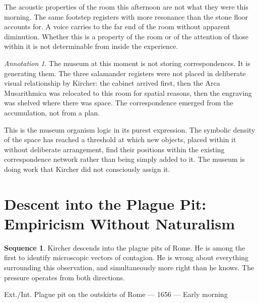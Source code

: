 \documentclass[12pt, a4paper, twoside]{memoir}
\theoremstyle{definition}
\newtheorem{sequence}{Sequence}[chapter]
\theoremstyle{remark}
\newtheorem{annotation}{Annotation}[chapter]
\newenvironment{sceneheading}{%
  \vspace{8pt}%
  \noindent\begin{mdframed}[
    linecolor=arkgold,
    linewidth=0.8pt,
    leftmargin=0pt,
    rightmargin=0pt,
    innerleftmargin=6pt,
    innerrightmargin=6pt,
    innertopmargin=4pt,
    innerbottommargin=4pt,
    backgroundcolor=arkgold!6
  ]%
  \noindent\textsc\bgroup\small
}{%
  \egroup\end{mdframed}\vspace{4pt}%
}
\newenvironment{museumnote}{%
  \vspace{4pt}%
  \noindent\begin{mdframed}[
    linecolor=arkgold!60,
    linewidth=0.4pt,
    leftline=true, rightline=false, topline=false, bottomline=false,
    innerleftmargin=8pt,
    innerrightmargin=0pt,
    innertopmargin=2pt,
    innerbottommargin=2pt,
    backgroundcolor=arkgold!4
  ]%
  \footnotesize\color{plaguegrey}%
}{%
  \end{mdframed}\vspace{4pt}%
}
\begin{document}
\begin{museumnote}
The acoustic properties of the room this afternoon are not what they were this morning. The same footstep registers with more resonance than the stone floor accounts for. A voice carries to the far end of the room without apparent diminution. Whether this is a property of the room or of the attention of those within it is not determinable from inside the experience.
\end{museumnote}

\begin{annotation}
The museum at this moment is not storing correspondences. It is generating them. The three salamander registers were not placed in deliberate visual relationship by Kircher: the cabinet arrived first, then the Arca Musarithmica was relocated to this room for spatial reasons, then the engraving was shelved where there was space. The correspondence emerged from the accumulation, not from a plan.

This is the museum organism logic in its purest expression. The symbolic density of the space has reached a threshold at which new objects, placed within it without deliberate arrangement, find their positions within the existing correspondence network rather than being simply added to it. The museum is doing work that Kircher did not consciously assign it.
\end{annotation}

\clearpage

\section{Descent into the Plague Pit: Empiricism Without Naturalism}

\begin{sequence}
\label{seq:plague-pit}
Kircher descends into the plague pits of Rome. He is among the first to identify microscopic vectors of contagion. He is wrong about everything surrounding this observation, and simultaneously more right than he knows. The pressure operates from both directions.
\end{sequence}

\begin{sceneheading}
Ext./Int. Plague pit on the outskirts of Rome --- 1656 --- Early morning
\end{sceneheading}
\end{document}
